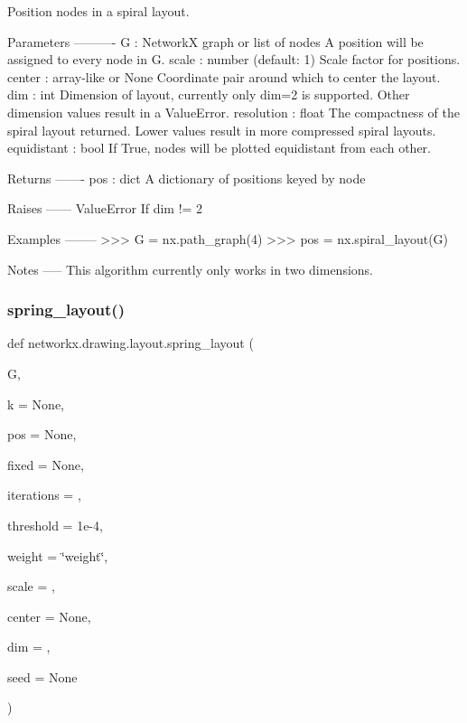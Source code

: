 \begin{DoxyVerb}Position nodes in a spiral layout.

Parameters
----------
G : NetworkX graph or list of nodes
    A position will be assigned to every node in G.
scale : number (default: 1)
    Scale factor for positions.
center : array-like or None
    Coordinate pair around which to center the layout.
dim : int
    Dimension of layout, currently only dim=2 is supported.
    Other dimension values result in a ValueError.
resolution : float
    The compactness of the spiral layout returned.
    Lower values result in more compressed spiral layouts.
equidistant : bool
    If True, nodes will be plotted equidistant from each other.

Returns
-------
pos : dict
    A dictionary of positions keyed by node

Raises
------
ValueError
    If dim != 2

Examples
--------
>>> G = nx.path_graph(4)
>>> pos = nx.spiral_layout(G)

Notes
-----
This algorithm currently only works in two dimensions.\end{DoxyVerb}
 \mbox{\label{namespacenetworkx_1_1drawing_1_1layout_a49950bbfa7bf1c305bc9e049459ab7b9}} 
\subsubsection{\texorpdfstring{spring\+\_\+layout()}{spring\_layout()}}
{\footnotesize\ttfamily def networkx.\+drawing.\+layout.\+spring\+\_\+layout (\begin{DoxyParamCaption}\item[{}]{G,  }\item[{}]{k = {\ttfamily None},  }\item[{}]{pos = {\ttfamily None},  }\item[{}]{fixed = {\ttfamily None},  }\item[{}]{iterations = {},  }\item[{}]{threshold = {\ttfamily 1e-\/4},  }\item[{}]{weight = {\ttfamily \char`\"{}weight\char`\"{}},  }\item[{}]{scale = {},  }\item[{}]{center = {\ttfamily None},  }\item[{}]{dim = {},  }\item[{}]{seed = {\ttfamily None} }\end{DoxyParamCaption})}


